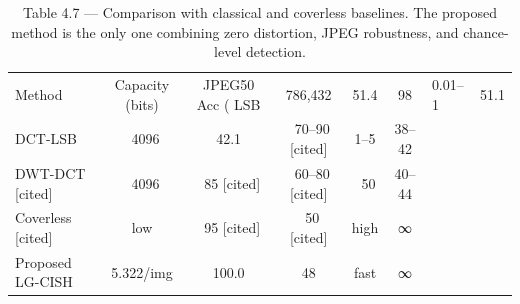 \begin{table}[htbp]
\centering
\caption{Table 4.7 — Comparison with classical and coverless baselines. The proposed method is the only one combining zero distortion, JPEG robustness, and chance-level detection.}
\label{tab:table_4_7_comparison}
\begin{tabular}{lccccc}
\hline
Method & Capacity (bits) & JPEG50 Acc (%
\hline
LSB & 786,432 & 51.4 & 98 & 0.01–1 & 51.1 \\
DCT-LSB & ~4096 & 42.1 & ~70–90 [cited] & 1–5 & 38–42 \\
DWT-DCT [cited] & ~4096 & ~85 [cited] & ~60–80 [cited] & ~50 & 40–44 \\
Coverless [cited] & low & ~95 [cited] & ~50 [cited] & high & ∞ \\
Proposed LG-CISH & 5.322/img & 100.0 & 48 & fast & ∞ \\
\hline
\end{tabular}
\end{table}
